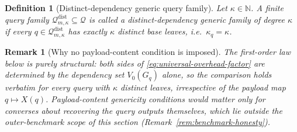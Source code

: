 \documentclass[journal]{IEEEtran}
\newcommand{\Qdist}{\mathcal Q_{m,\kappa}^{\mathrm{dist}}}
\newtheorem{definition}{Definition}[section]
\newtheorem{remark}{Remark}[section]
\numberwithin{equation}{section}
\begin{document}
\begin{definition}[Distinct-dependency generic query family]
\label{def:generic-payload-family}
Let \(\kappa\in\mathbb N\).  A finite query family
\(\Qdist\subseteq\mathcal Q\) is called a \emph{distinct-dependency generic
family of degree \(\kappa\)} if every \(q\in\Qdist\) has exactly \(\kappa\)
distinct base leaves, i.e.\ \(\kappa_q=\kappa\).
\end{definition}

\begin{remark}[Why no payload-content condition is imposed]
\label{rem:genericity-counting}
The first-order law below is purely structural: both sides of
\eqref{eq:universal-overhead-factor} are determined by the dependency set
\(V_0(G_q)\) alone, so the comparison holds verbatim for every query with
\(\kappa\) distinct leaves, irrespective of the payload map
\(q\mapsto X(q)\).  Payload-content genericity conditions would matter only
for converses about recovering the query outputs themselves, which lie
outside the outer-benchmark scope of this section
(Remark~\ref{rem:benchmark-honesty}).
\end{remark}
\end{document}
